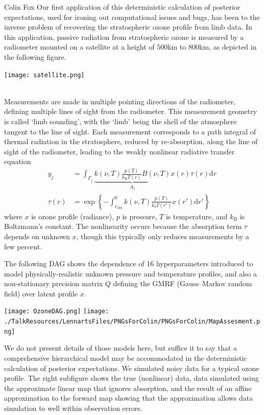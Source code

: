 \documentclass{owrart}
\theoremstyle{plain}
\newcommand{\dd}{\mathrm{d}}
\begin{document}
\begin{talk}{Colin Fox}
Our first application of this deterministic calculation of posterior expectations, used for ironing out computational issues and bugs, has been to the inverse problem of recovering the stratospheric ozone profile from limb data. In this application, passive radiation from stratospheric ozone is measured by a radiometer mounted on a satellite at a height of $500$km to $800$km, as depicted in the following figure.\\
 \centerline{\texttt{[image: satellite.png]}}\\[1.5ex]
Measurements are made in multiple pointing directions of the radiometer, defining multiple lines of sight from the radiometer. This measurement geometry is called `limb sounding', with the `limb' being the shell of the atmosphere tangent to the line of sight.
Each measurement corresponds to a path integral of thermal radiation in the stratosphere, reduced by re-absorption, along the line of sight of the radiometer, leading to the weakly nonlinear radiative transfer equation
\begin{align*}
   y_j &=   \int_{\Gamma_j} \underbrace{  k(\nu, T)   \frac{p(T)}{k_{\text{B}} T(r)} B(\nu,T)}_{ {A_{j}} }  x(r) \tau(r) \dd r \, \\
       \tau(r) &= \exp{ \left\{ - \int^{0}_{r_\text{obs}}  k(\nu, T)   \frac{p(T)}{k_b T(r')}  x(r') \dd r' \right\} }
\end{align*}
where $x$ is ozone profile (radiance), $p$ is pressure, $T$ is temperature, and $k_\text{B}$ is Boltzmann's constant. The nonlinearity occurs because the absorption term $\tau$ depends on unknown $x$, though this typically only reduces measurements by a few percent.

The following DAG shows the dependence of 16 hyperparameters introduced to model physically-realistic unknown pressure and temperature profiles, and also a non-stationary precision matrix $Q$ defining the GMRF (Gauss--Markov random field) over latent profile $x$. \\
\centerline{
\texttt{[image: OzoneDAG.png]}
\texttt{[image: ./TalkResources/LennartsFiles/PNGsForColin/PNGsForColin/MapAssesment.png]}
}
We do not present details of those models here, but suffice it to say that a comprehensive hierarchical model may be accommodated in the deterministic calculation of posterior expectations. We simulated noisy data for a typical ozone profile. The right subfigure shows the true (nonlinear) data, data simulated using the approximate linear map that ignores absorption, and the result of an affine approximation to the forward map showing that the approximation allows data simulation to well within observation errors.


\end{talk}
\end{document}
